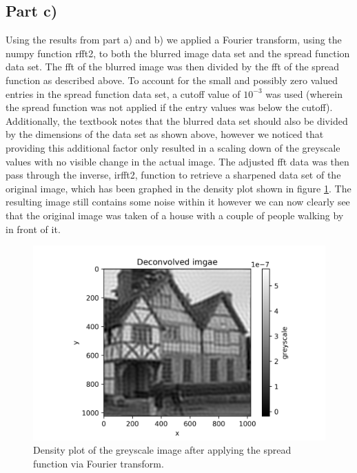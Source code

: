 \documentclass{article}
\begin{document}
\subsection{Part c)}
Using the results from part a) and b) we applied a Fourier transform, using the numpy function rfft2, to both the blurred image data set and the spread function data set.
The fft of the blurred image was then divided by the fft of the spread function as described above. To account for the small and possibly zero valued entries in the spread function data set, a cutoff value of $10^{-3}$ was used (wherein the spread function was not applied if the entry values was below the cutoff). Additionally, the textbook notes that the blurred data set should also be divided by the dimensions of the data set as shown above, however we noticed that providing this additional factor only resulted in a scaling down of the greyscale values with no visible change in the actual image.
The adjusted fft data was then pass through the inverse, irfft2, function to retrieve a sharpened data set of the original image, which has been graphed in the density plot shown in figure \ref{fig:deconvolved_image}. The resulting image still contains some noise within it however we can now clearly see that the original image was taken of a house with a couple of people walking by in front of it. 

\begin{figure}[H]
	\centering
	\includegraphics{../images/deconvolved_image.png}
	\caption{Density plot of the greyscale image after applying the spread function via Fourier transform.}
	\label{fig:deconvolved_image}	
\end{figure}
\end{document}
